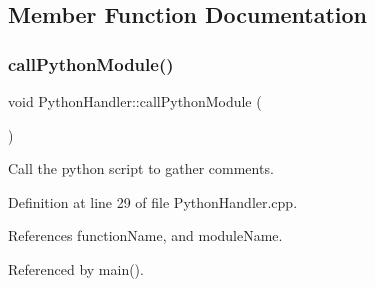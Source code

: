 \subsection{Member Function Documentation}
\mbox{\label{class_python_handler_ac60ae844922ca438081e1f8cc0164b45}} 
\subsubsection{\texorpdfstring{call\+Python\+Module()}{callPythonModule()}}
{\footnotesize\ttfamily void Python\+Handler\+::call\+Python\+Module (\begin{DoxyParamCaption}{ }\end{DoxyParamCaption})}



Call the python script to gather comments. 



Definition at line 29 of file Python\+Handler.\+cpp.



References function\+Name, and module\+Name.



Referenced by main().


